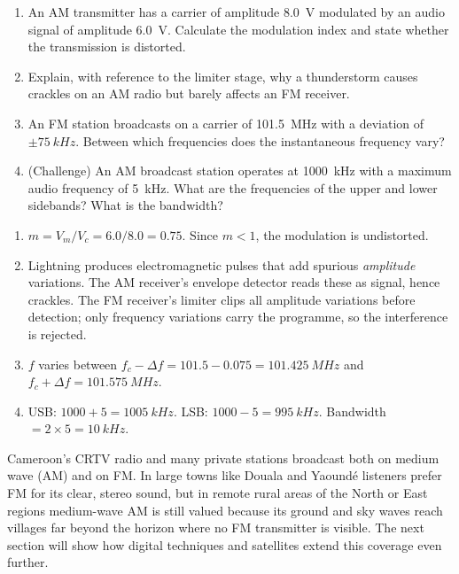\documentclass[11pt]{article}
\begin{document}
\begin{exercice}
\begin{enumerate}
\item An AM transmitter has a carrier of amplitude \SI{8.0}{V} modulated by an audio signal of amplitude \SI{6.0}{V}. Calculate the modulation index and state whether the transmission is distorted.
\item Explain, with reference to the limiter stage, why a thunderstorm causes crackles on an AM radio but barely affects an FM receiver.
\item An FM station broadcasts on a carrier of \SI{101.5}{MHz} with a deviation of $\pm\SI{75}{kHz}$. Between which frequencies does the instantaneous frequency vary?
\item (Challenge) An AM broadcast station operates at \SI{1000}{kHz} with a maximum audio frequency of \SI{5}{kHz}. What are the frequencies of the upper and lower sidebands? What is the bandwidth?
\end{enumerate}
\end{exercice}

\begin{corrige}[Exercise 1]
\begin{enumerate}
\item $m = V_m/V_c = 6.0/8.0 = 0.75$. Since $m<1$, the modulation is undistorted.
\item Lightning produces electromagnetic pulses that add spurious \emph{amplitude} variations. The AM receiver's envelope detector reads these as signal, hence crackles. The FM receiver's limiter clips all amplitude variations before detection; only frequency variations carry the programme, so the interference is rejected.
\item $f$ varies between $f_c - \Delta f = 101.5 - 0.075 = \SI{101.425}{MHz}$ and $f_c + \Delta f = \SI{101.575}{MHz}$.
\item USB: $1000 + 5 = \SI{1005}{kHz}$. LSB: $1000 - 5 = \SI{995}{kHz}$. Bandwidth $= 2 \times 5 = \SI{10}{kHz}$.
\end{enumerate}
\end{corrige}

\begin{savaistu}
Cameroon's CRTV radio and many private stations broadcast both on medium wave (AM) and on FM. In large towns like Douala and Yaound\'e listeners prefer FM for its clear, stereo sound, but in remote rural areas of the North or East regions medium-wave AM is still valued because its ground and sky waves reach villages far beyond the horizon where no FM transmitter is visible. The next section will show how digital techniques and satellites extend this coverage even further.
\end{savaistu}
\end{document}

